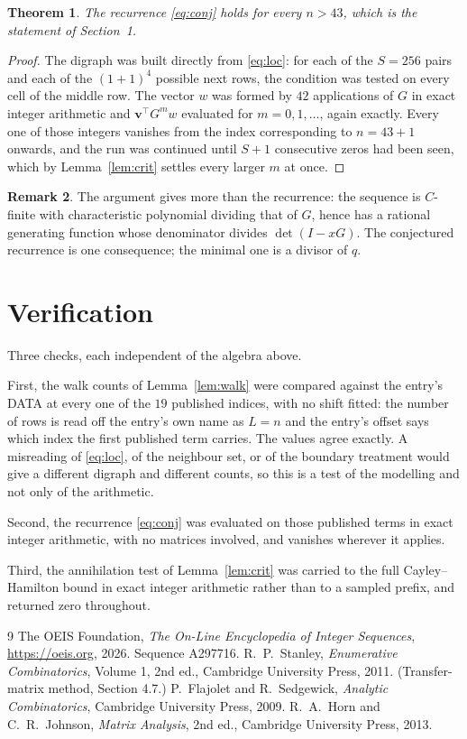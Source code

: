 \documentclass[11pt,a4paper]{article}
\theoremstyle{plain}
\newtheorem{theorem}{Theorem}
\theoremstyle{definition}
\newtheorem{remark}[theorem]{Remark}
\begin{document}
\begin{theorem}
The recurrence \eqref{eq:conj} holds for every $n>43$, which is the statement of
Section~1.
\end{theorem}

\begin{proof}
The digraph was built directly from \eqref{eq:loc}: for each of the $S=256$ pairs and each
of the $(1+1)^{4}$ possible next rows, the condition was tested on every cell of
the middle row. The vector $w$ was formed by $42$ applications of $G$ in exact integer
arithmetic and $\mathbf{v}^{\!\top}G^{m}w$ evaluated for $m=0,1,\dots$, again exactly.
Every one of those integers vanishes from the index corresponding to $n=43+1$ onwards,
and the run was continued until $S+1$ consecutive zeros had been seen, which by
Lemma~\ref{lem:crit} settles every larger $m$ at once.
\end{proof}

\begin{remark}
The argument gives more than the recurrence: the sequence is $C$-finite with characteristic
polynomial dividing that of $G$, hence has a rational generating function whose denominator
divides $\det(I-xG)$. The conjectured recurrence is one consequence; the minimal one is a
divisor of $q$.
\end{remark}

\section{Verification}

Three checks, each independent of the algebra above.

First, the walk counts of Lemma~\ref{lem:walk} were compared against the entry's DATA at
every one of the $19$ published indices, with no shift fitted: the number of rows is
read off the entry's own name as $L=n$ and the entry's offset says which index the first
published term carries. The values agree exactly. A misreading of \eqref{eq:loc}, of the
neighbour set, or of the boundary treatment would give a different digraph and different
counts, so this is a test of the modelling and not only of the arithmetic.

Second, the recurrence \eqref{eq:conj} was evaluated on those published terms in exact
integer arithmetic, with no matrices involved, and vanishes wherever it applies.

Third, the annihilation test of Lemma~\ref{lem:crit} was carried to the full
Cayley--Hamilton bound in exact integer arithmetic rather than to a sampled prefix, and
returned zero throughout.

\begin{thebibliography}{9}
 The OEIS Foundation, \emph{The On-Line Encyclopedia of Integer
Sequences}, \url{https://oeis.org}, 2026. Sequence A297716.
 R.~P.~Stanley, \emph{Enumerative Combinatorics}, Volume 1, 2nd ed.,
Cambridge University Press, 2011. (Transfer-matrix method, Section 4.7.)
 P.~Flajolet and R.~Sedgewick, \emph{Analytic Combinatorics}, Cambridge
University Press, 2009.
 R.~A.~Horn and C.~R.~Johnson, \emph{Matrix Analysis}, 2nd ed., Cambridge
University Press, 2013.
\end{thebibliography}
\end{document}
